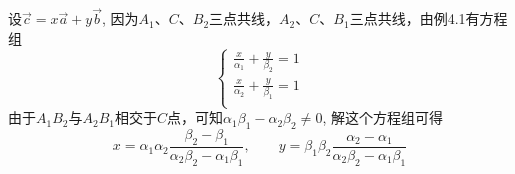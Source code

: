 \begin{solution}
    设$\vec{c}=x\vec{a}+y\vec{b}$, 因为$A_1$、$C$、$B_2$三点共线，$A_2$、$C$、$B_1$三点共线，由例4.1有方程组
\[\begin{cases}
    \frac{x}{\alpha_1}+\frac{y}{\beta_2}=1\\
    \frac{x}{\alpha_2}+\frac{y}{\beta_1}=1\\
\end{cases}\]
由于$A_1B_2$与$A_2B_1$相交于$C$点，可知$\alpha_1\beta_1-\alpha_2\beta_2\ne 0$, 解这个方程组可得
\[x=\alpha_1\alpha_2\frac{\beta_2-\beta_1}{\alpha_2\beta_2-\alpha_1\beta_1},\qquad y=\beta_1\beta_2\frac{\alpha_2-\alpha_1}{\alpha_2\beta_2-\alpha_1\beta_1}\]
\end{solution}


\begin{example}
    
\end{example}

\begin{solution}
    
\end{solution}

\begin{example}
    
\end{example}



\begin{solution}
    
\end{solution}

\begin{example}
    
\end{example}

\begin{solution}
    
\end{solution}



\begin{example}
    
\end{example}

\begin{example}
    
\end{example}


\begin{solution}
    
\end{solution}

